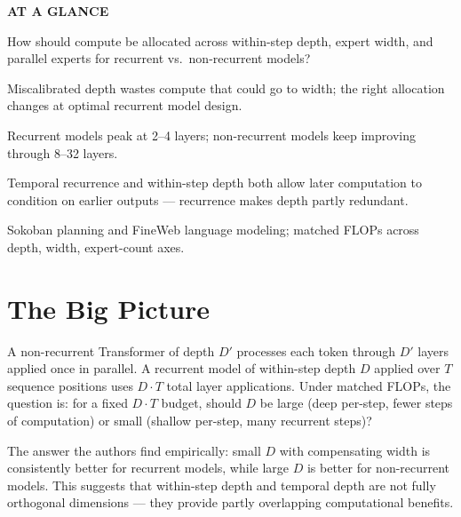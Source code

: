 \documentclass[10pt,twocolumn]{article}
\begin{document}
\begin{mdframed}[backgroundcolor=boxgray,linecolor=rulered,linewidth=1pt,
    innerleftmargin=6pt,innerrightmargin=6pt,
    innertopmargin=6pt,innerbottommargin=6pt]
\textbf{\small AT A GLANCE}\par\vspace{4pt}
\begin{description}[leftmargin=0pt,labelsep=4pt,itemsep=2pt,parsep=0pt,
    font=\small\bfseries]
  \item[Problem:] How should compute be allocated across within-step
    depth, expert width, and parallel experts for recurrent vs.\
    non-recurrent models?
  \item[Why it matters:] Miscalibrated depth wastes compute that
    could go to width; the right allocation changes at optimal
    recurrent model design.
  \item[Finding:] Recurrent models peak at 2--4 layers; non-recurrent
    models keep improving through 8--32 layers.
  \item[Explanation:] Temporal recurrence and within-step depth both
    allow later computation to condition on earlier outputs ---
    recurrence makes depth partly redundant.
  \item[Evidence:] Sokoban planning and FineWeb language modeling;
    matched FLOPs across depth, width, expert-count axes.
\end{description}
\end{mdframed}

\section{The Big Picture}

A non-recurrent Transformer of depth $D'$ processes each token through
$D'$ layers applied once in parallel. A recurrent model of within-step
depth $D$ applied over $T$ sequence positions uses $D\cdot T$ total
layer applications. Under matched FLOPs, the question is: for a fixed
$D\cdot T$ budget, should $D$ be large (deep per-step, fewer steps of
computation) or small (shallow per-step, many recurrent steps)?

The answer the authors find empirically: small $D$ with compensating
width is consistently better for recurrent models, while large $D$ is
better for non-recurrent models. This suggests that within-step depth
and temporal depth are not fully orthogonal dimensions --- they provide
partly overlapping computational benefits.
\end{document}
